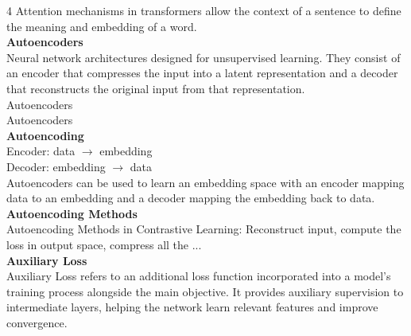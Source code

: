 \documentclass[8pt]{extarticle}
\begin{document}
\begin{multicols}{4}
Attention mechanisms in transformers allow the context of a sentence to define the meaning and embedding of a word.\\
\vspace{2pt}\textbf{Autoencoders}\\
Neural network architectures designed for unsupervised learning. They consist of an encoder that compresses the input into a latent representation and a decoder that reconstructs the original input from that representation.\\
Autoencoders\\
Autoencoders\\
\vspace{2pt}\textbf{Autoencoding}\\
Encoder: data $\rightarrow$ embedding\\
Decoder: embedding $\rightarrow$ data\\
Autoencoders can be used to learn an embedding space with an encoder mapping data to an embedding and a decoder mapping the embedding back to data.\\
\vspace{2pt}\textbf{Autoencoding Methods}\\
Autoencoding Methods in Contrastive Learning: Reconstruct input, compute the loss in output space, compress all the ...\\
\vspace{2pt}\textbf{Auxiliary Loss}\\
Auxiliary Loss refers to an additional loss function incorporated into a model's training process alongside the main objective. It provides auxiliary supervision to intermediate layers, helping the network learn relevant features and improve convergence.\\


\end{multicols}
\end{document}
